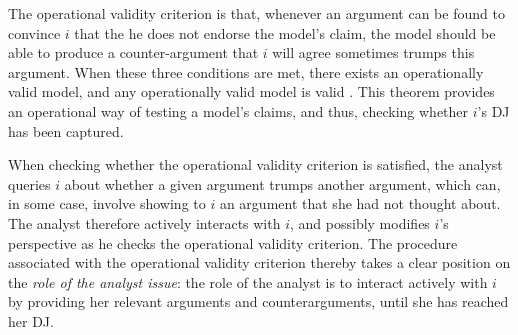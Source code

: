 \documentclass[version=3.21, pagesize, twoside=off, bibliography=totoc, DIV=calc, fontsize=12pt, a4paper, french, english]{scrartcl}
\begin{document}
The operational validity criterion is that, whenever an argument can be found to convince $i$ that the he does not endorse the model's claim, the model should be able to produce a counter-argument that $i$ will agree sometimes trumps this argument. When these three conditions are met, there exists an operationally valid model, and any operationally valid model is valid \citep{cailloux_formal_2018}. This theorem provides an operational way of testing a model’s claims, and thus, checking whether $i$’s \ac{DJ} has been captured.

When checking whether the operational validity criterion is satisfied, the analyst queries $i$ about whether a given argument trumps another argument, which can, in some case, involve showing to $i$ an argument that she had not thought about. The analyst therefore actively interacts with $i$, and possibly modifies $i$’s perspective as he checks the operational validity criterion. 
The procedure associated with the operational validity criterion thereby takes a clear position on the \emph{role of the analyst issue}: the role of the analyst is to interact actively with $i$ by providing her relevant arguments and counterarguments, until she has reached her \ac{DJ}.
\end{document}
